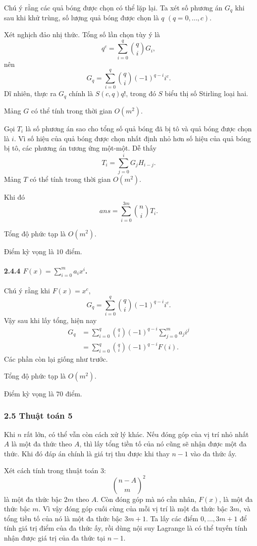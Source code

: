 \documentclass[11pt]{article}
\begin{document}
Chú ý rằng các quả bóng được chọn có thể lặp lại. Ta xét số phương án \(G_q\)
khi sau khi khử trùng, số lượng quả bóng được chọn là \(q\)
\((q=0,\ldots,c)\).

Xét nghịch đảo nhị thức. Tổng số lần chọn tùy ý là
\[
  q^c=\sum_{i=0}^{q}\binom{q}{i}G_i,
\]
nên
\[
  G_q=\sum_{i=0}^{q}\binom{q}{i}(-1)^{q-i}i^c.
\]
Dĩ nhiên, thực ra \(G_q\) chính là \(S(c,q)q!\), trong đó \(S\) biểu thị số
Stirling loại hai.

Mảng \(G\) có thể tính trong thời gian \(O(m^2)\).

Gọi \(T_i\) là số phương án sao cho tổng số quả bóng đã bị tô và quả bóng được
chọn là \(i\). Vì số hiệu của quả bóng được chọn nhất định nhỏ hơn số hiệu của
quả bóng bị tô, các phương án tương ứng một-một. Dễ thấy
\[
  T_i=\sum_{j=0}^{i}G_jH_{i-j}.
\]
Mảng \(T\) có thể tính trong thời gian \(O(m^2)\).

Khi đó
\[
  ans=\sum_{i=0}^{3m}\binom{n}{i}T_i.
\]

Tổng độ phức tạp là \(O(m^2)\).

Điểm kỳ vọng là \(10\) điểm.

\paragraph{2.4.4 \(F(x)=\sum_{i=0}^{m}a_i x^i\).}
Chú ý rằng khi \(F(x)=x^c\),
\[
  G_q=\sum_{i=0}^{q}\binom{q}{i}(-1)^{q-i}i^c.
\]
Vậy sau khi lấy tổng, hiện nay
\[
\begin{aligned}
  G_q
  &=\sum_{i=0}^{q}\binom{q}{i}(-1)^{q-i}
    \sum_{j=0}^{m}a_j i^j\\
  &=\sum_{i=0}^{q}\binom{q}{i}(-1)^{q-i}F(i).
\end{aligned}
\]
Các phần còn lại giống như trước.

Tổng độ phức tạp là \(O(m^2)\).

Điểm kỳ vọng là \(70\) điểm.

\subsubsection*{2.5 Thuật toán 5}

Khi \(n\) rất lớn, có thể vẫn còn cách xử lý khác. Nếu đóng góp của vị trí nhỏ
nhất \(A\) là một đa thức theo \(A\), thì lấy tổng tiền tố của nó cũng sẽ nhận
được một đa thức. Khi đó đáp án chính là giá trị thu được khi thay \(n-1\) vào
đa thức ấy.

Xét cách tính trong thuật toán 3:
\[
  \binom{n-A}{m}^{2}
\]
là một đa thức bậc \(2m\) theo \(A\). Còn đóng góp mà nó cần nhân, \(F(x)\), là
một đa thức bậc \(m\). Vì vậy đóng góp cuối cùng của mỗi vị trí là một đa thức
bậc \(3m\), và tổng tiền tố của nó là một đa thức bậc \(3m+1\). Ta lấy các
điểm \(0,\ldots,3m+1\) để tính giá trị điểm của đa thức ấy, rồi dùng nội suy
Lagrange là có thể tuyến tính nhận được giá trị của đa thức tại \(n-1\).
\end{document}
